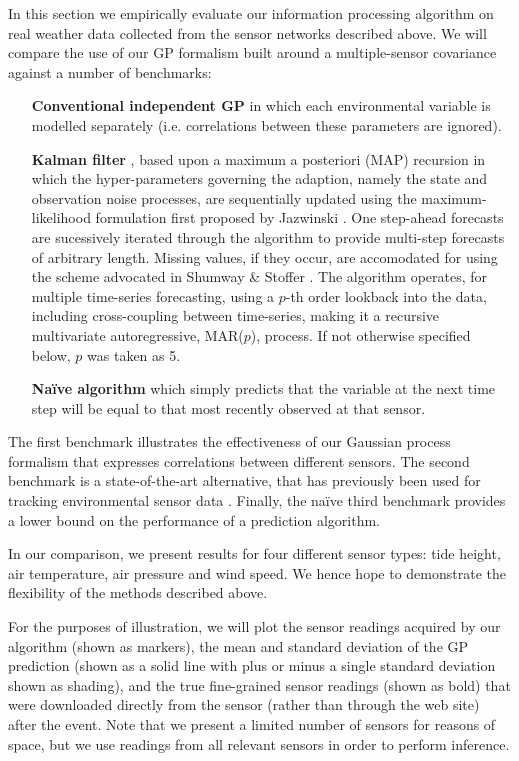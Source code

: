 \documentclass{acmtrans2m}
\begin{document}
\noindent In this section we empirically evaluate our information processing algorithm on real weather data collected from the sensor networks described above. 
We will compare the use of our GP formalism built around a multiple-sensor covariance against a number of benchmarks:
\begin{itemize}
\item[\bf Conventional independent GP\normalfont] in which each environmental variable is modelled separately (i.e. correlations between these parameters are ignored). 
\item[\bf Kalman filter\normalfont], based upon a maximum a posteriori
(MAP) recursion in which the hyper-parameters governing the adaption,
namely the state and observation noise processes, are sequentially
updated using the maximum-likelihood formulation first proposed by
Jazwinski \cite{Jazwinski}. One step-ahead forecasts are
sucessively iterated through the algorithm to provide multi-step
forecasts of arbitrary length. Missing values, if they occur, are
accomodated for using the scheme advocated in Shumway \& Stoffer
\cite{Shumway+Stoffer:00}.  The algorithm operates, for multiple time-series
forecasting, using a $p$-th order lookback into the data, including
cross-coupling between time-series, making it a recursive multivariate
autoregressive, MAR($p$), process. If not otherwise specified below, $p$ was taken as 5.
\item[\bf Na\"{i}ve algorithm\normalfont] which simply predicts that the variable at the next time step will be equal to that most recently observed at that sensor.
\end{itemize}
The first benchmark illustrates the effectiveness of our Gaussian process formalism that expresses correlations between different sensors. The second benchmark is a state-of-the-art alternative, that has previously been used for tracking environmental sensor data \cite{kalman_oceanography}. Finally, the na\"{i}ve third benchmark provides a lower bound on the performance of a prediction algorithm.

In our comparison, we present results for four different sensor types: tide height, air temperature, air pressure and wind speed. We hence hope to demonstrate the flexibility of the methods described above.

For the purposes of illustration, we will plot the sensor readings acquired by our algorithm (shown as markers), the mean and standard deviation of the GP prediction (shown as a solid line with plus or minus a single standard deviation shown as shading), and the true fine-grained sensor readings (shown as bold) that were downloaded directly from the sensor (rather than through the web site) after the event. Note that we present a limited number of sensors for reasons of space, but we use readings from all relevant sensors in order to perform inference. 
\end{document}
